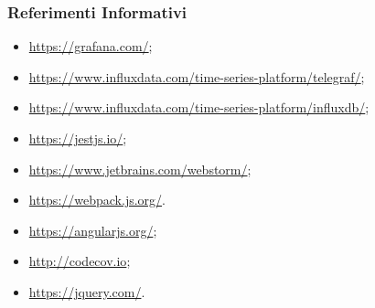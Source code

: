 \subsubsection{Referimenti Informativi}
\begin{itemize}
	\item \url{https://grafana.com/};
	\item \url{https://www.influxdata.com/time-series-platform/telegraf/};
	\item \url{https://www.influxdata.com/time-series-platform/influxdb/};
	\item \url{https://jestjs.io/};
	\item \url{https://www.jetbrains.com/webstorm/};
	\item \url{https://webpack.js.org/}.
	\item \url{https://angularjs.org/};
	\item \url{http://codecov.io};
	\item \url{https://jquery.com/}.
\end{itemize}